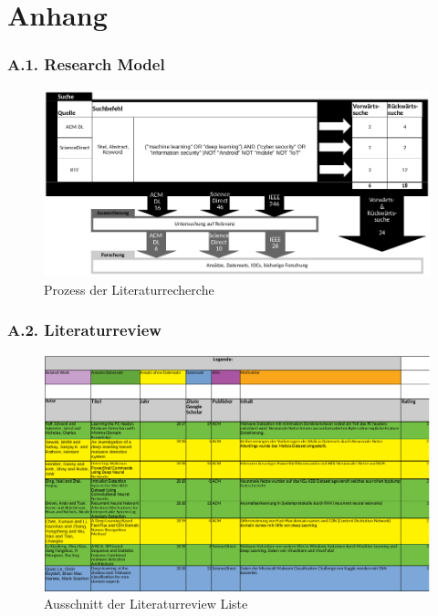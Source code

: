 \documentclass[
    12pt, %
    DIV10,
    ngerman, %
    a4paper, %
    oneside, %
    titlepage, %
    parskip=half, %
    headings=normal, %
    listof=totoc, %
    bibliography=totoc, %
    index=totoc, %
    captions=tableheading, %
    final %
]{scrreprt}
\begin{document}
\appendix
\newpage
\chapter{Anhang}
\subsection*{A.1. Research Model}\label{rm}

\begin{figure}[h!]
\hspace{-2.3cm}
\includegraphics[width=1.3\textwidth]{img/rm}
\caption*{Prozess der Literaturrecherche}
\end{figure}
\newpage
\subsection*{A.2. Literaturreview}\label{literaturr}

\begin{figure}[h!]
\hspace{-2.2cm}
\includegraphics[width=1.3\textwidth]{img/literaturr}
\caption*{Ausschnitt der Literaturreview Liste}
\end{figure}
\newpage
\end{document}
